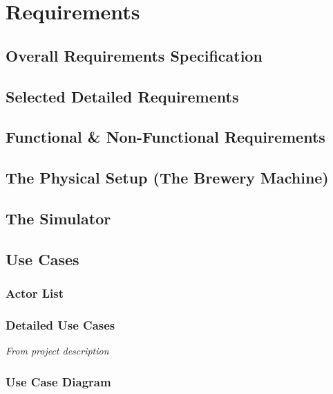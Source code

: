 \section{Requirements}

\subsection{Overall Requirements Specification}

\subsection{Selected Detailed Requirements}

\subsection{Functional \& Non-Functional Requirements}

\subsection{The Physical Setup (The Brewery Machine)}

\subsection{The Simulator}


\subsection{Use Cases}

\subsubsection{Actor List}

\subsubsection{Detailed Use Cases}
\textit{From project description}

\subsubsection{Use Case Diagram}
